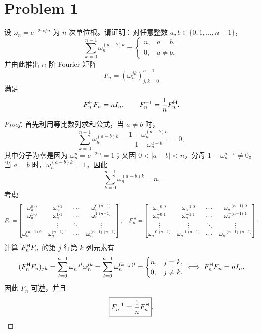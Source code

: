 \section*{Problem 1}

设 $\omega_n = e^{-2\pi \mathrm{i}/n}$ 为 $n$ 次单位根。请证明：对任意整数
$a, b \in \{0, 1, \ldots, n - 1\}$，
\[
    \sum_{k = 0}^{n - 1} \omega_n^{(a - b)k}
    =
    \begin{cases}
        n, & a = b, \\
        0, & a \neq b.
    \end{cases}
\]
并由此推出 $n$ 阶 Fourier 矩阵
\[
    F_n = \left(\omega_n^{jk}\right)_{j,k = 0}^{n - 1}
\]
满足
\[
    F_n^{\mathsf{H}} F_n = n I_n, \qquad F_n^{-1} = \frac{1}{n} F_n^{\mathsf{H}}.
\]

\begin{proof}
    首先利用等比数列求和公式，当 $a \neq b$ 时，
    \[
        \sum_{k = 0}^{n - 1} \omega_n^{(a - b)k}
        = \frac{1 - \omega_n^{(a - b)n}}{1 - \omega_n^{a - b}}
        = 0,
    \]
    其中分子为零是因为 $\omega_n^n = e^{-2\pi \mathrm{i}} = 1$；又因 $0<|a-b|<n$，分母 $1-\omega_n^{a-b}\neq0$。当 $a = b$ 时，$\omega_n^{(a - b)k} = 1$，因此
    \[
        \sum_{k = 0}^{n - 1} \omega_n^{(a - b)k} = n.
    \]
    考虑
    \[
        F_n = \begin{bmatrix}
            \omega_n^{0 \cdot 0} & \omega_n^{0 \cdot 1} & \cdots & \omega_n^{0 \cdot (n - 1)} \\
            \omega_n^{1 \cdot 0} & \omega_n^{1 \cdot 1} & \cdots & \omega_n^{1 \cdot (n - 1)} \\
            \vdots & \vdots & \ddots & \vdots \\
            \omega_n^{(n - 1) \cdot 0} & \omega_n^{(n - 1) \cdot 1} & \cdots & \omega_n^{(n - 1) \cdot (n - 1)}
        \end{bmatrix}, \quad F_n^{\mathsf{H}} = \begin{bmatrix}
            \omega_n^{-0 \cdot 0} & \omega_n^{-1 \cdot 0} & \cdots & \omega_n^{-(n - 1) \cdot 0} \\
            \omega_n^{-0 \cdot 1} & \omega_n^{-1 \cdot 1} & \cdots & \omega_n^{-(n - 1) \cdot 1} \\
            \vdots & \vdots & \ddots & \vdots \\
            \omega_n^{-0 \cdot (n - 1)} & \omega_n^{-1 \cdot (n - 1)} & \cdots & \omega_n^{-(n - 1) \cdot (n - 1)}
        \end{bmatrix}.
    \]
    计算 $F_n^{\mathsf{H}} F_n$ 的第 $j$ 行第 $k$ 列元素有
    \[
        (F_n^{\mathsf{H}} F_n)_{jk} = \sum_{l = 0}^{n - 1} \omega_n^{-jl} \omega_n^{lk} = \sum_{l = 0}^{n - 1} \omega_n^{(k - j)l} = \begin{cases}
            n, & j = k, \\
            0, & j \neq k.
        \end{cases} \iff F_n^{\mathsf{H}} F_n = nI_n.
    \]
    因此 $F_n$ 可逆，并且
    \[
        \boxed{F_n^{-1}=\frac1nF_n^{\mathsf{H}}}.
    \]
\end{proof}


